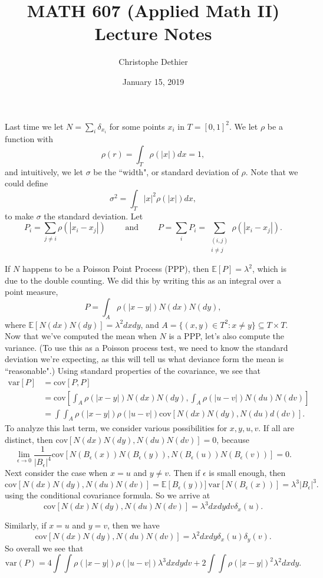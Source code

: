 \documentclass[12pt]{article}
\title{MATH 607 (Applied Math II) Lecture Notes}
\author{Christophe Dethier}
\date{January 15, 2019}
\newcommand{\var}{\text{var}}
\newcommand{\cov}{\text{cov}}
\theoremstyle{plain}
\begin{document}
\bigskip
\maketitle

Last time we let $N = \sum_i \delta_{x_i}$ for some points $x_i$ in $T = [0,1]^2$. We let $\rho$ be a function with
\[
\rho(r) = \int_T \rho(|x|)dx = 1,
\]
and intuitively, we let $\sigma$ be the ``width", or standard deviation of $\rho$. Note that we could define
\[
\sigma^2 = \int_T |x|^2\rho(|x|)dx,
\]
to make $\sigma$ the standard deviation. Let
\[
P_i = \sum_{j \neq i} \rho(|x_i - x_j|) \quad \quad \text{ and } \quad \quad P = \sum_i P_i = \sum_{\substack{(i,j) \\ i \neq j}} \rho(|x_i - x_j|).
\]

If $N$ happens to be a Poisson Point Process (PPP), then $\mathbb{E}[P] = \lambda^2$, which is due to the double counting. We did this by writing this as an integral over a point measure,
\[
P = \int_A \rho(|x - y|) N(dx)N(dy),
\]
where $\mathbb{E}[N(dx)N(dy)] = \lambda^2 dx dy$, and $A = \{(x,y) \in T^2: x \neq y\} \subseteq T \times T$.\\

Now that we've computed the mean when $N$ is a PPP, let's also compute the variance. (To use this as a Poisson process test, we need to know the standard deviation we're expecting, as this will tell us what deviance form the mean is ``reasonable".) Using standard properties of the covariance, we see that
\begin{align*}
\var[P] &= \cov[P,P]\\
&= \cov\left[ \int_A \rho(|x - y|) N(dx)N(dy), \int_A \rho(|u - v|) N(du)N(dv) \right]\\
&= \int \int_A \rho(|x - y|) \rho(|u - v|) \cov[N(dx)N(dy), N(du) d(dv)].
\end{align*}
To analyze this last term, we consider various possibilities for $x, y, u, v$. If all are distinct, then $\cov[N(dx)N(dy), N(du)N(dv)] = 0$, because
\[
\lim_{\epsilon \rightarrow 0} \frac{1}{|B_{\epsilon}|^4} \cov[N(B_{\epsilon}(x))N(B_{\epsilon}(y)), N(B_{\epsilon}(u))N(B_{\epsilon}(v))] = 0.
\]
Next consider the case when $x = u$ and $y \neq v$. Then if $\epsilon$ is small enough, then 
\[
\cov[N(dx)N(dy), N(du)N(dv)] = \mathbb{E}[B_{\epsilon}(y))] \var[N(B_{\epsilon}(x))] = \lambda^3 |B_{\epsilon}|^3.
\]
using the conditional covariance formula. So we arrive at
\[
\cov[N(dx)N(dy), N(du)N(dv)] = \lambda^3 dxdydv \delta_x(u).
\]

Similarly, if $x = u$ and $y = v$, then we have
\[
\cov[N(dx)N(dy), N(du)N(dv)] = \lambda^2 dxdy \delta_x(u)\delta_y(v).
\]
So overall we see that
\[
\var(P) = 4 \int \int \rho(|x - y|) \rho(|u - v|)\lambda^3 dxdydv + 2 \int \int \rho(|x - y|)^2 \lambda^2 dxdy.
\]
\end{document}
